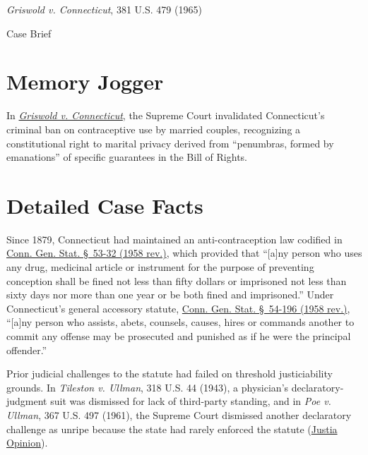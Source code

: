 \documentclass[12pt]{article}
\begin{document}
\begin{center}
{\LARGE \textit{Griswold v. Connecticut}, 381 U.S. 479 (1965)\par}
\vspace{0.8em}
{\large Case Brief\par}
\end{center}
\vspace{1em}

\section{Memory Jogger}
In \href{https://www.courtlistener.com/opinion/107082/griswold-v-connecticut/}{\textit{Griswold v. Connecticut}}, the Supreme Court invalidated Connecticut's criminal ban on contraceptive use by married couples, recognizing a constitutional right to marital privacy derived from ``penumbras, formed by emanations'' of specific guarantees in the Bill of Rights.

\section{Detailed Case Facts}
Since 1879, Connecticut had maintained an anti-contraception law codified in \href{https://supreme.justia.com/cases/federal/us/381/479/}{Conn. Gen. Stat. \S~53-32 (1958 rev.)}, which provided that ``[a]ny person who uses any drug, medicinal article or instrument for the purpose of preventing conception shall be fined not less than fifty dollars or imprisoned not less than sixty days nor more than one year or be both fined and imprisoned.'' Under Connecticut's general accessory statute, \href{https://supreme.justia.com/cases/federal/us/381/479/}{Conn. Gen. Stat. \S~54-196 (1958 rev.)}, ``[a]ny person who assists, abets, counsels, causes, hires or commands another to commit any offense may be prosecuted and punished as if he were the principal offender.''

Prior judicial challenges to the statute had failed on threshold justiciability grounds. In \textit{Tileston v. Ullman}, 318 U.S. 44 (1943), a physician's declaratory-judgment suit was dismissed for lack of third-party standing, and in \textit{Poe v. Ullman}, 367 U.S. 497 (1961), the Supreme Court dismissed another declaratory challenge as unripe because the state had rarely enforced the statute (\href{https://supreme.justia.com/cases/federal/us/381/479/}{Justia Opinion}).
\end{document}

